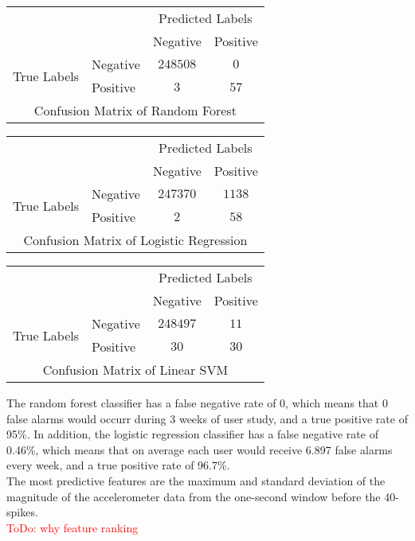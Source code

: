 \begin{tabular}{l|l|c|c|}
\multicolumn{2}{c}{} &\multicolumn{2}{c}{Predicted Labels}\\
\cline{3-4}
\multicolumn{2}{c|}{}&Negative&Positive \\
\cline{2-4}
\multirow{2}{*}{True Labels}& Negative  & $248508$ & $0$ \\
\cline{2-4}
& Positive & $3$ & $57$ \\
\cline{2-4}
\multicolumn{4}{c}{Confusion Matrix of Random Forest} 
\end{tabular}

\begin{tabular}{l|l|c|c|}
\multicolumn{2}{c}{} &\multicolumn{2}{c}{Predicted Labels}\\
\cline{3-4}
\multicolumn{2}{c|}{}&Negative&Positive \\
\cline{2-4}
\multirow{2}{*}{True Labels}& Negative  & $247370$ & $1138$ \\
\cline{2-4}
& Positive & $2$ & $58$ \\
\cline{2-4}
\multicolumn{4}{c}{Confusion Matrix of Logistic Regression} 
\end{tabular}

\begin{tabular}{l|l|c|c|}
\multicolumn{2}{c}{} &\multicolumn{2}{c}{Predicted Labels}\\
\cline{3-4}
\multicolumn{2}{c|}{}&Negative&Positive \\
\cline{2-4}
\multirow{2}{*}{True Labels}& Negative  & $248497$ & $11$ \\
\cline{2-4}
& Positive & $30$ & $30$ \\
\cline{2-4}
\multicolumn{4}{c}{Confusion Matrix of Linear SVM} 
\end{tabular}

The random forest classifier has a false negative rate of 0, which means that 0 false alarms would occurr during 3 weeks of user study, and a true positive rate of 95\%. 
In addition, the logistic regression classifier has a false negative rate of 0.46\%, which means that on average each user would receive 6.897 false alarms every week, and a true positive rate of 96.7\%. \\
The most predictive features are the maximum and standard deviation of the magnitude of the accelerometer data from the one-second window before the 40-spikes. \\
\textcolor{red}{ToDo: why feature ranking} \\

